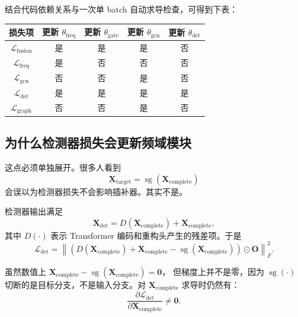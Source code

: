 \documentclass[UTF8]{ctexart}
\begin{document}
结合代码依赖关系与一次单 batch 自动求导检查，可得到下表：
\begin{center}
\begin{tabular}{ccccc}
\toprule
损失项 & 更新 \(\theta_{\text{freq}}\) & 更新 \(\theta_{\text{gate}}\) & 更新 \(\theta_{\text{gcn}}\) & 更新 \(\theta_{\text{det}}\) \\
\midrule
\(\mathcal{L}_{\text{fusion}}\) & 是 & 是 & 是 & 否 \\
\(\mathcal{L}_{\text{freq}}\) & 是 & 否 & 否 & 否 \\
\(\mathcal{L}_{\text{gcn}}\) & 否 & 否 & 是 & 否 \\
\(\mathcal{L}_{\text{det}}\) & 是 & 是 & 是 & 是 \\
\(\mathcal{L}_{\text{graph}}\) & 否 & 否 & 是 & 否 \\
\bottomrule
\end{tabular}
\end{center}

\subsection{为什么检测器损失会更新频域模块}

这点必须单独展开。很多人看到
\begin{equation}
    \bm{X}_{\text{target}} = \operatorname{sg}(\bm{X}_{\text{complete}})
\end{equation}
会误以为检测器损失不会影响插补器。其实不是。

检测器输出满足
\begin{equation}
    \bm{X}_{\text{det}} = D(\bm{X}_{\text{complete}}) + \bm{X}_{\text{complete}},
\end{equation}
其中 \(D(\cdot)\) 表示 Transformer 编码和重构头产生的残差项。于是
\begin{equation}
    \mathcal{L}_{\text{det}}
    =
    \left\|
    \left(
        D(\bm{X}_{\text{complete}})
        + \bm{X}_{\text{complete}}
        - \operatorname{sg}(\bm{X}_{\text{complete}})
    \right)\odot \bm{O}
    \right\|_F^2.
\end{equation}

虽然数值上
\(\bm{X}_{\text{complete}}-\operatorname{sg}(\bm{X}_{\text{complete}})=\bm{0}\)，
但梯度上并不是零，因为 \(\operatorname{sg}(\cdot)\) 切断的是目标分支，不是输入分支。对 \(\bm{X}_{\text{complete}}\) 求导时仍然有：
\begin{equation}
    \frac{\partial \mathcal{L}_{\text{det}}}{\partial \bm{X}_{\text{complete}}}
    \neq \bm{0}.
\end{equation}
\end{document}
